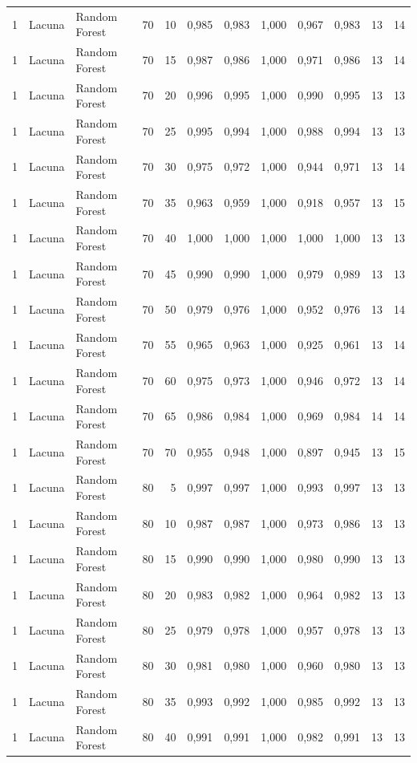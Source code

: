 \begin{longtable}{@{}rllrrrrrrrrr@{}}
1 & Lacuna & Random Forest & 70 & 10 & 0,985 & 0,983 & 1,000 & 0,967 & 0,983 & 13 & 14 \\
1 & Lacuna & Random Forest & 70 & 15 & 0,987 & 0,986 & 1,000 & 0,971 & 0,986 & 13 & 14 \\
1 & Lacuna & Random Forest & 70 & 20 & 0,996 & 0,995 & 1,000 & 0,990 & 0,995 & 13 & 13 \\
1 & Lacuna & Random Forest & 70 & 25 & 0,995 & 0,994 & 1,000 & 0,988 & 0,994 & 13 & 13 \\
1 & Lacuna & Random Forest & 70 & 30 & 0,975 & 0,972 & 1,000 & 0,944 & 0,971 & 13 & 14 \\
1 & Lacuna & Random Forest & 70 & 35 & 0,963 & 0,959 & 1,000 & 0,918 & 0,957 & 13 & 15 \\
1 & Lacuna & Random Forest & 70 & 40 & 1,000 & 1,000 & 1,000 & 1,000 & 1,000 & 13 & 13 \\
1 & Lacuna & Random Forest & 70 & 45 & 0,990 & 0,990 & 1,000 & 0,979 & 0,989 & 13 & 13 \\
1 & Lacuna & Random Forest & 70 & 50 & 0,979 & 0,976 & 1,000 & 0,952 & 0,976 & 13 & 14 \\
1 & Lacuna & Random Forest & 70 & 55 & 0,965 & 0,963 & 1,000 & 0,925 & 0,961 & 13 & 14 \\
1 & Lacuna & Random Forest & 70 & 60 & 0,975 & 0,973 & 1,000 & 0,946 & 0,972 & 13 & 14 \\
1 & Lacuna & Random Forest & 70 & 65 & 0,986 & 0,984 & 1,000 & 0,969 & 0,984 & 14 & 14 \\
1 & Lacuna & Random Forest & 70 & 70 & 0,955 & 0,948 & 1,000 & 0,897 & 0,945 & 13 & 15 \\
1 & Lacuna & Random Forest & 80 & 5 & 0,997 & 0,997 & 1,000 & 0,993 & 0,997 & 13 & 13 \\
1 & Lacuna & Random Forest & 80 & 10 & 0,987 & 0,987 & 1,000 & 0,973 & 0,986 & 13 & 13 \\
1 & Lacuna & Random Forest & 80 & 15 & 0,990 & 0,990 & 1,000 & 0,980 & 0,990 & 13 & 13 \\
1 & Lacuna & Random Forest & 80 & 20 & 0,983 & 0,982 & 1,000 & 0,964 & 0,982 & 13 & 13 \\
1 & Lacuna & Random Forest & 80 & 25 & 0,979 & 0,978 & 1,000 & 0,957 & 0,978 & 13 & 13 \\
1 & Lacuna & Random Forest & 80 & 30 & 0,981 & 0,980 & 1,000 & 0,960 & 0,980 & 13 & 13 \\
1 & Lacuna & Random Forest & 80 & 35 & 0,993 & 0,992 & 1,000 & 0,985 & 0,992 & 13 & 13 \\
1 & Lacuna & Random Forest & 80 & 40 & 0,991 & 0,991 & 1,000 & 0,982 & 0,991 & 13 & 13 \\

\end{longtable}
